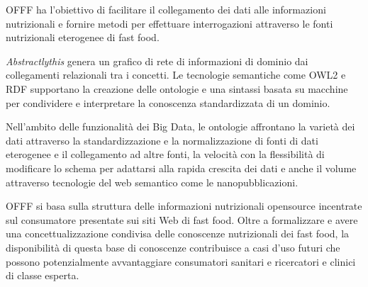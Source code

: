 OFFF ha l'obiettivo di facilitare il collegamento dei dati alle informazioni nutrizionali e fornire metodi per effettuare interrogazioni attraverso le fonti nutrizionali eterogenee di fast food. 

\emph{Abstractlythis} genera un grafico di rete di informazioni di dominio dai collegamenti relazionali tra i concetti. Le tecnologie semantiche come OWL2 e RDF supportano la creazione delle ontologie e una sintassi basata su macchine per condividere e interpretare la conoscenza standardizzata di un dominio. 

Nell'ambito delle funzionalità dei Big Data, le ontologie affrontano la varietà dei dati attraverso la standardizzazione e la normalizzazione di fonti di dati eterogenee e il collegamento ad altre fonti, la velocità con la flessibilità di modificare lo schema per adattarsi alla rapida crescita dei dati e anche il volume attraverso tecnologie del web semantico come le nanopubblicazioni. 

OFFF si basa sulla struttura delle informazioni nutrizionali opensource incentrate sul consumatore presentate sui siti Web di fast food. Oltre a formalizzare e avere una concettualizzazione condivisa delle conoscenze nutrizionali dei fast food, la disponibilità di questa base di conoscenze contribuisce a casi d'uso futuri che possono potenzialmente avvantaggiare consumatori sanitari e ricercatori e clinici di classe esperta.



